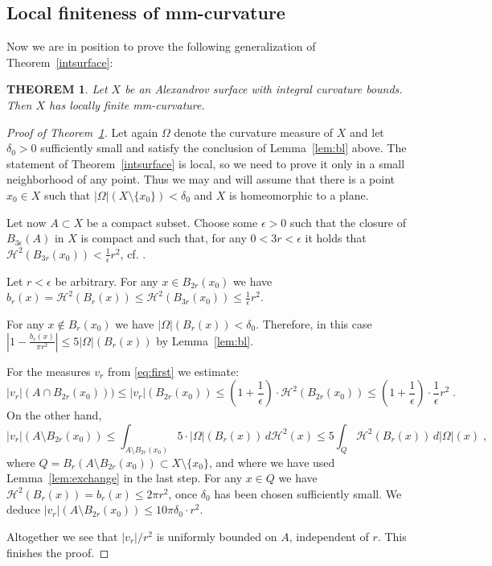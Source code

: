 \documentclass[12pt,leqno]{amsart}
\numberwithin{equation}{section}
\newtheorem{thm}{THEOREM}[section]
\theoremstyle{definition}
\theoremstyle{remark}
\newcommand{\tref}[1]{Theorem~\ref{#1}}
\newcommand{\lref}[1]{Lemma~\ref{#1}}
\begin{document}
 \subsection{Local finiteness of mm-curvature}
 Now we are in position to prove
 the following generalization of  \tref{intsurface}:
 \begin{thm}\label{intsurface1}
 Let $X$ be an Alexandrov surface with integral curvature bounds.  Then $X$ has locally finite mm-curvature.
  \end{thm}
 \begin{proof}[Proof of \tref{intsurface1}]
 Let again $\Omega$ denote the curvature measure of $X$ and let $\delta _0>0$ sufficiently small and satisfy the conclusion of  \lref{lem:bl} above.
 The statement  of \tref{intsurface} is local, so we need to prove it only in a small neighborhood of any point.
 Thus we may and will assume that there is a point $x_0\in X$
 such that $| \Omega| (X \setminus  \{ x_0 \} )< \delta _0$ and  $X$ is homeomorphic to a plane.



  Let now $A\subset X$  be a compact subset. Choose some $\epsilon >0$ such that the closure of  $B_{3\epsilon} (A)$ in $X$ is compact and such that,
  for any $0<3r<\epsilon$ it holds that  $\mathcal H^2 (B_{3r}(x_0)) < \frac 1 {\epsilon} r^2$, cf. \cite[Lemma 8.1.1]{Reshetnyak-GeomIV}.

 Let  $r<\epsilon$    be arbitrary.
 For any $x\in B_{2r} (x_0)$ we have $b_r (x)  =\mathcal H^2 (B_r (x)) \leq \mathcal H^2 (B_{3r} (x_0)) \leq \frac 1 {\epsilon} r^2 $.


For any $x\notin B_{r} (x_0)$ we have $| \Omega |(B_r (x)) < \delta _0$. Therefore, in this case  $|1-\frac {b_r(x)}  {\pi r^2} | \leq 5 |\Omega | ( B_{r} (x))$ by Lemma~\ref{lem:bl}.

For the measures $v_r$ from \eqref{eq:first} we estimate:
 $$|v_r| (A\cap B_{2r} (x_0))) \leq |v_r| (B_{2r} (x_0))  \leq (1+ \frac 1 {\epsilon}) \cdot \mathcal H^2 (B_{2r} (x_0)) \leq
 (1+ \frac 1 {\epsilon}) \cdot \frac 1 {\epsilon} r^2 \; .$$
On the other hand,
$$|v_r| (A\setminus B_{2r} (x_0)) \leq \int _{A\setminus B_{2r} (x_0)} 5 \cdot |\Omega| (B_r (x)) \, d\mathcal H^2 (x) \leq 5 \int _Q \mathcal H^2 (B_r(x))  \, d|\Omega | (x) \; ,$$
where $Q=B_r(A\setminus B_{2r} (x_0)) \subset X\setminus \{ x_0 \}$, and where we have used \lref{lem:exchange} in the last step.
 For any $x\in Q$ we have $\mathcal H^2 (B_r(x))  =b_r (x) \leq 2\pi  r^2$, once $\delta _0$ has been chosen sufficiently small.
We deduce $|v_r| (A\setminus B_{2r} (x_0)) \leq 10 \pi \delta _0 \cdot r^2$.

Altogether we see that $|v_r| /r^2$ is uniformly bounded on $A$, independent of $r$.  This finishes the proof.
\end{proof}
\end{document}
